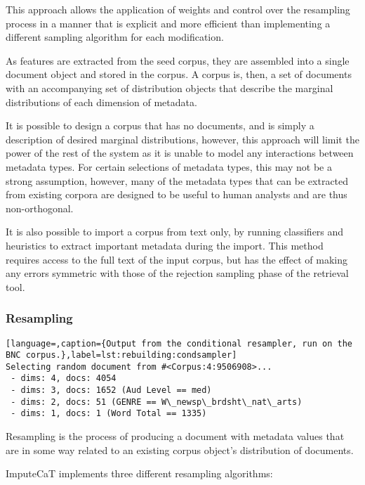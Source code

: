 This approach allows the application of weights and control over the resampling process in a manner that is explicit and more efficient than implementing a different sampling algorithm for each modification.

As features are extracted from the seed corpus, they are assembled into a single document object and stored in the corpus.  A corpus is, then, a set of documents with an accompanying set of distribution objects that describe the marginal distributions of each dimension of metadata.

It is possible to design a corpus that has no documents, and is simply a description of desired marginal distributions, however, this approach will limit the power of the rest of the system as it is unable to model any interactions between metadata types.  For certain selections of metadata types, this may not be a strong assumption, however, many of the metadata types that can be extracted from existing corpora are designed to be useful to human analysts and are thus non-orthogonal.

It is also possible to import a corpus from text only, by running classifiers and heuristics to extract important metadata during the import.  This method requires access to the full text of the input corpus, but has the effect of making any errors symmetric with those of the rejection sampling phase of the retrieval tool.


\subsubsection{Resampling}
\label{sec:rebuilding:method:retrieval:resampling}

\begin{lstlisting}[language=,caption={Output from the conditional resampler, run on the BNC corpus.},label=lst:rebuilding:condsampler]
Selecting random document from #<Corpus:4:9506908>...
 - dims: 4, docs: 4054
 - dims: 3, docs: 1652 (Aud Level == med)
 - dims: 2, docs: 51 (GENRE == W\_newsp\_brdsht\_nat\_arts)
 - dims: 1, docs: 1 (Word Total == 1335)
\end{lstlisting}

Resampling is the process of producing a document with metadata values that are in some way related to an existing corpus object's distribution of documents.

ImputeCaT implements three different resampling algorithms:

